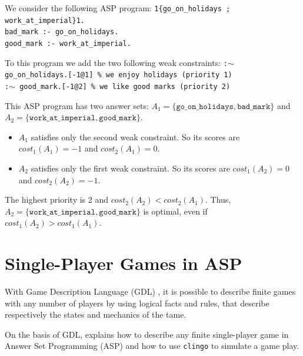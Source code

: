 \begin{example}
We consider the following ASP program:\newline
\texttt{1\{go\_on\_holidays ; work\_at\_imperial\}1.\\
bad\_mark :- go\_on\_holidays.\\
good\_mark :- work\_at\_imperial.}

\smallskip

To this program we add the two following weak constraints:\newline
\texttt{:$\sim$ go\_on\_holidays.[-1@1] \% we enjoy holidays (priority 1)\\
:$\sim$ good\_mark.[-1@2] \% we like good marks (priority 2)}

\smallskip

This ASP program has two answer sets: $A_1 = \{ \texttt{go\_on\_holidays}, \texttt{bad\_mark}\}$ and $A_2 = \{ \texttt{work\_at\_imperial}, \texttt{good\_mark} \}$. 

\begin{itemize}
\item $A_1$ satisfies only the second weak constraint. So its scores are $cost_1(A_1)=-1$ and $cost_2(A_1)=0$.
\item $A_2$ satisfies only the first weak constraint. So its scores are $cost_1(A_2)=0$ and $cost_2(A_2)=-1$.
\end{itemize}

The highest priority is 2 and $cost_2(A_2)<cost_2(A_1)$. Thus, $A_2=\{ \texttt{work\_at\_imperial}, \texttt{good\_mark} \}$ is optimal, even if $cost_1(A_2)>cost_1(A_1)$.
\end{example}

\section{Single-Player Games in ASP}


With Game Description Language (GDL) \citep{gdl}, it is possible to describe finite games with any number of players by using logical facts and rules, that describe respectively the states and mechanics of the tame.

\smallskip

On the basis of GDL, \citep{thielscher2009answer} explains how to describe any finite single-player game in Answer Set Programming (ASP) and how to use \texttt{clingo} to simulate a game play.

